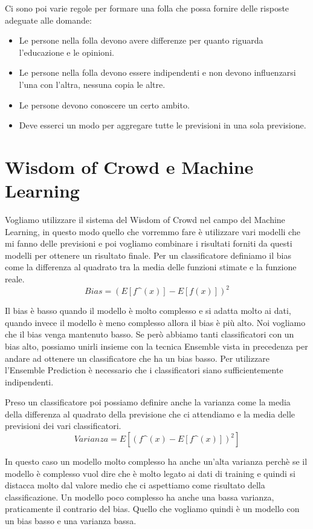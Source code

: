 \documentclass[14pt]{extreport}
\begin{document}
Ci sono poi varie regole per formare una folla che possa fornire delle risposte adeguate alle domande:
\begin{itemize}
    \item Le persone nella folla devono avere differenze per quanto riguarda l'educazione e le opinioni.
    \item Le persone nella folla devono essere indipendenti e non devono influenzarsi l'una con l'altra, nessuna copia le altre.
    \item Le persone devono conoscere un certo ambito.
    \item Deve esserci un modo per aggregare tutte le previsioni in una sola previsione.
\end{itemize}

\section{Wisdom of Crowd e Machine Learning}

Vogliamo utilizzare il sistema del Wisdom of Crowd nel campo del Machine Learning, in questo modo quello che vorremmo fare è utilizzare vari modelli che mi fanno delle previsioni e poi vogliamo combinare i risultati forniti da questi modelli per ottenere un risultato finale.
Per un classificatore definiamo il bias come la differenza al quadrato tra la media delle funzioni stimate e la funzione reale.
\begin{equation}
    Bias = (E[f\^(x)] - E[f(x)])^2
\end{equation}

Il bias è basso quando il modello è molto complesso e si adatta molto ai dati, quando invece il modello è meno complesso allora il bias è più alto. Noi vogliamo che il bias venga mantenuto basso.
Se però abbiamo tanti classificatori con un bias alto, possiamo unirli insieme con la tecnica Ensemble vista in precedenza per andare ad ottenere un classificatore che ha un bias basso.
Per utilizzare l'Ensemble Prediction è necessario che i classificatori siano sufficientemente indipendenti.

Preso un classificatore poi possiamo definire anche la varianza come la media della differenza al quadrato della previsione che ci attendiamo e la media delle previsioni dei vari classificatori.
\begin{equation}
    Varianza = E[(f\^(x) - E[f\^(x)])^2]
\end{equation}

In questo caso un modello molto complesso ha anche un'alta varianza perchè se il modello è complesso vuol dire che è molto legato ai dati di training e quindi si distacca molto dal valore medio che ci aspettiamo come risultato della classificazione. Un modello poco complesso ha anche una bassa varianza, praticamente il contrario del bias.
Quello che vogliamo quindi è un modello con un bias basso e una varianza bassa.
\end{document}
